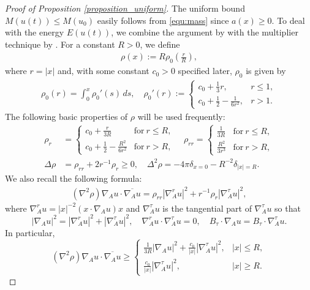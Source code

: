 \documentclass[10pt%
]{amsart}
\numberwithin{equation}{section}
\theoremstyle{definition}
\begin{document}
\begin{proof}[Proof of Proposition \ref{proposition_uniform}]
	The uniform bound $M(u(t))\le M(u_0)$ easily follows from \eqref{equ:mass}  since $a(x)\ge0$. To deal with the energy $E(u(t))$, we combine the argument by \cite{LS25} with the multiplier technique by \cite{Fanelli-Vega}. For a constant $R>0$, we define
	\begin{align*}
		\rho(x):=R\rho_0\left(\frac rR\right),
	\end{align*}
	where $r=|x|$ and, with some constant $c_0>0$ specified later, $\rho_0$ is given by
	\begin{align*}
		\rho_0(r)=\int_0^x\rho_0'(s)\,ds,\quad \rho_0'(r):=\begin{cases}
			c_0+\frac13r,&r\leq1,\\
			c_0+\frac12-\frac{1}{6r^2},&r>1. 
		\end{cases}
	\end{align*}
	The following basic properties of $\rho$ will be used frequently: 
	\begin{align*}
		\rho_r
		&=\begin{cases}
			c_0+\frac{r}{3R}&\text{for}\ r\leq R,\\
			c_0+\frac12-\frac{R^2}{6r^2}&\text{for}\ r>R,
		\end{cases}\quad 
		\rho_{rr}
		=\begin{cases}
			\frac{1}{3R}&\text{for}\ r\leq R,\\
			\frac{R^2}{3r^3}&\text{for}\ r>R,
		\end{cases}\\
		\Delta\rho&=\rho_{rr}+2r^{-1}\rho_r\ge0,\quad
		\Delta^2\rho=-4\pi\delta_{x=0}-R^{-2}\delta_{|x|=R}.
	\end{align*}
	We also recall the following formula:
	\begin{align*}
		(\nabla^2\rho) \nabla_A u\cdot \overline{\nabla_A u}
		=\rho_{rr}|\nabla_A^ru|^2+r^{-1}\rho_r|\nabla_A^\tau u|^2,
	\end{align*}
	where $\nabla_A^ru=|x|^{-2}(x\cdot\nabla_A u)x$ and $\nabla_A^\tau u$ is the tangential part of $\nabla_A^\tau u$ so that 
	$$|\nabla_Au|^2=|\nabla_A^ru|^2+|\nabla_A^\tau u|^2,\quad \nabla_A^ru\cdot \nabla_A^\tau u=0,\quad B_\tau\cdot\nabla_Au=B_\tau\cdot\nabla_A^\tau u.$$
	In particular, 
	$$
	(\nabla^2\rho) \nabla_A u\cdot \overline{\nabla_A u}\ge \begin{cases}\frac{1}{3R}|\nabla_Au|^2+\frac{c_0}{|x|}|\nabla_A^\tau u|^2,& |x|\le R,\\\frac{c_0}{|x|}|\nabla_A^\tau u|^2,& |x|\ge R.
	\end{cases}
	$$
	

\end{proof}
\end{document}
